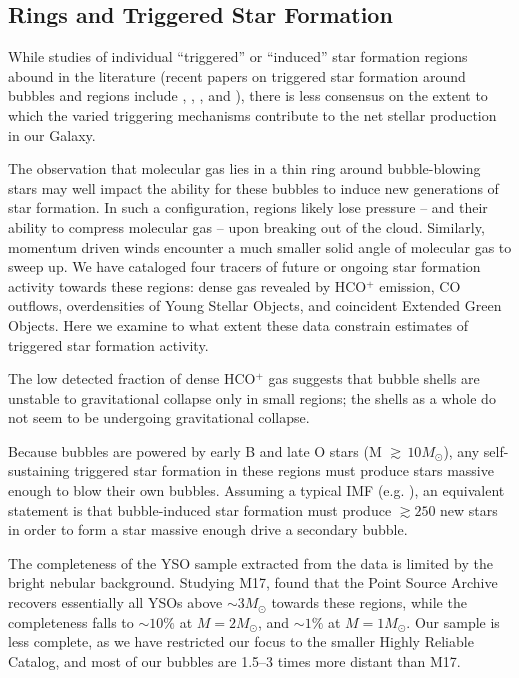\subsection{Rings and Triggered Star Formation}
While studies of individual ``triggered'' or ``induced'' star formation regions abound in
the literature (recent papers on triggered star formation around bubbles and \hii regions
include \citealt{Deharveng09}, \citealt{Snider09}, \citealt{Koenig08}, and \citealt{Pomares09}), there is less
consensus on the extent to which the varied triggering mechanisms contribute to the
net stellar production in our Galaxy.

The observation that molecular gas lies in a thin ring around bubble-blowing stars may well impact
the ability for these bubbles to induce new generations of star formation. In such a configuration,
\hii regions likely lose pressure -- and their ability to compress molecular gas -- upon breaking out
of the cloud. Similarly, momentum driven winds encounter a much smaller solid angle of molecular gas
to sweep up. We have cataloged
four tracers of future or ongoing star formation activity towards these regions: dense gas revealed by
HCO$^+$ emission, CO outflows, overdensities of Young Stellar Objects, and coincident Extended
Green Objects. Here we examine to what extent these data constrain estimates of triggered star formation activity.

The low detected fraction of dense HCO$^+$ gas suggests that bubble shells are unstable
to gravitational collapse only in small regions; the shells as a whole do not seem to be
undergoing gravitational collapse.

Because bubbles are powered by early B and late O stars (M $\gtrsim\, 10 M_\odot$),
any self-sustaining triggered star formation in these regions must produce stars
massive enough to blow their own bubbles.  Assuming a typical IMF (e.g. \citealt{Muench02}),
an equivalent statement is that bubble-induced star formation must produce $\gtrsim 250$
new stars in order to form a star massive enough drive a secondary bubble.

The completeness of the YSO sample extracted from the \glimpse
data is limited by the bright nebular background. Studying M17,  found that the \glimpse
Point Source Archive recovers essentially all YSOs above $\sim 3 M_\odot$ towards these regions,
while the completeness falls to $\sim 10\%$ at $M = 2 M_\odot$, and $\sim 1\%$ at $M = 1 M_\odot$.
Our sample is less complete, as we have restricted our focus to the smaller Highly Reliable
Catalog, and most of our bubbles are 1.5--3 times more distant than M17.

